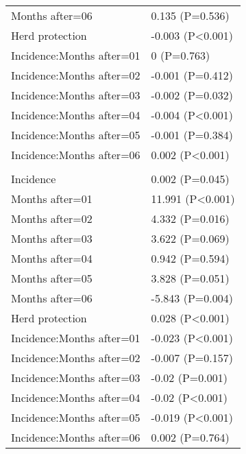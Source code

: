 \documentclass[]{article}
\begin{document}
\begin{longtable}[t]{ll}
\hspace{1em}Months after=06 & 0.135 (P=0.536)\\
\hspace{1em}Herd protection & -0.003 (P<0.001)\\
\hspace{1em}Incidence:Months after=01 & 0 (P=0.763)\\
\hspace{1em}Incidence:Months after=02 & -0.001 (P=0.412)\\
\hspace{1em}Incidence:Months after=03 & -0.002 (P=0.032)\\
\hspace{1em}Incidence:Months after=04 & -0.004 (P<0.001)\\
\hspace{1em}Incidence:Months after=05 & -0.001 (P=0.384)\\
\hspace{1em}Incidence:Months after=06 & 0.002 (P<0.001)\\
\addlinespace[1.5em]
\multicolumn{2}{l}{\textbf{Temporary not field worker}}\\
\hspace{1em}Incidence & 0.002 (P=0.045)\\
\hspace{1em}Months after=01 & 11.991 (P<0.001)\\
\hspace{1em}Months after=02 & 4.332 (P=0.016)\\
\hspace{1em}Months after=03 & 3.622 (P=0.069)\\
\hspace{1em}Months after=04 & 0.942 (P=0.594)\\
\hspace{1em}Months after=05 & 3.828 (P=0.051)\\
\hspace{1em}Months after=06 & -5.843 (P=0.004)\\
\hspace{1em}Herd protection & 0.028 (P<0.001)\\
\hspace{1em}Incidence:Months after=01 & -0.023 (P<0.001)\\
\hspace{1em}Incidence:Months after=02 & -0.007 (P=0.157)\\
\hspace{1em}Incidence:Months after=03 & -0.02 (P=0.001)\\
\hspace{1em}Incidence:Months after=04 & -0.02 (P<0.001)\\
\hspace{1em}Incidence:Months after=05 & -0.019 (P<0.001)\\
\hspace{1em}Incidence:Months after=06 & 0.002 (P=0.764)\\*
\end{longtable}
\end{document}

